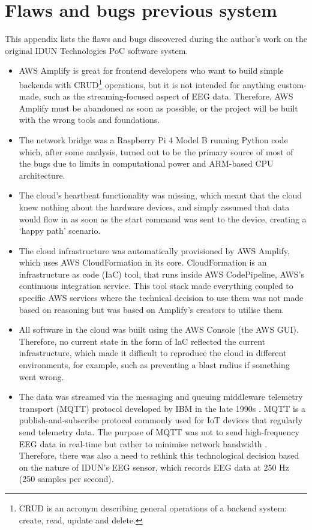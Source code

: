 \chapter{Flaws and bugs previous system}
\label{appendix2-flaws-and-bugs-previous-system}

This appendix lists the flaws and bugs discovered during the author’s work on the original IDUN Technologies PoC software system.

\begin{itemize}
  \item AWS Amplify is great for frontend developers who want to build simple backends with CRUD\footnote{CRUD is an acronym describing general operations of a backend system: create, read, update and delete.} operations, but it is not intended for anything custom-made, such as the streaming-focused aspect of EEG data. Therefore, AWS Amplify must be abandoned as soon as possible, or the project will be built with the wrong tools and foundations.
  \item The network bridge was a Raspberry Pi 4 Model B running Python code which, after some analysis, turned out to be the primary source of most of the bugs due to limits in computational power and ARM-based CPU architecture.
  \item The cloud’s heartbeat functionality was missing, which meant that the cloud knew nothing about the hardware devices, and simply assumed that data would flow in as soon as the start command was sent to the device, creating a ‘happy path’ scenario.
  \item The cloud infrastructure was automatically provisioned by AWS Amplify, which uses AWS CloudFormation in its core. CloudFormation is an infrastructure as code (IaC) tool, that runs inside AWS CodePipeline, AWS’s continuous integration service. This tool stack made everything coupled to specific AWS services where the technical decision to use them was not made based on reasoning but was based on Amplify’s creators to utilise them.
  \item All software in the cloud was built using the AWS Console (the AWS GUI). Therefore, no current state in the form of IaC reflected the current infrastructure, which made it difficult to reproduce the cloud in different environments, for example, such as preventing a blast radius if something went wrong.
  \item The data was streamed via the messaging and queuing middleware telemetry transport (MQTT) protocol developed by IBM in the late 1990s \citep{yuan_getting_2017}. MQTT is a publish-and-subscribe protocol commonly used for IoT devices that regularly send telemetry data. The purpose of MQTT was not to send high-frequency EEG data in real-time but rather to minimise network bandwidth \citep{mqtt_use_nodate}. Therefore, there was also a need to rethink this technological decision based on the nature of IDUN’s EEG sensor, which records EEG data at 250 Hz (250 samples per second).

\end{itemize}
